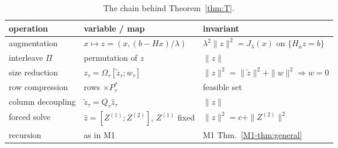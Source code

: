 \begin{table}[h]
\centering\small
\begin{tabular}{@{}lll@{}}
\toprule
operation & variable / map & invariant\\
\midrule
augmentation & $x\mapsto z=(x,(b-Hx)/\lambda)$ & $\lambda^2\|z\|^2=J_\lambda(x)$ on $\{H_az=b\}$\\
interleave $\Pi$ & permutation of $z$ & $\|z\|$\\
size reduction & $z_\tau=\Omega_\tau[\tilde z_\tau;w_\tau]$ & $\|z\|^2=\|\tilde z\|^2+\|w\|^2\Rightarrow w=0$\\
row compression & rows $\times P_\tau^*$ & feasible set\\
column decoupling & $\tilde z_\tau=Q_\tau\hat z_\tau$ & $\|z\|$\\
forced solve & $\hat z=[Z^{(1)};Z^{(2)}]$, $Z^{(1)}$ fixed & $\|z\|^2=c+\|Z^{(2)}\|^2$\\
recursion & as in M1 & M1 Thm.~\ref{M1-thm:general}\\
\bottomrule
\end{tabular}
\caption{The chain behind Theorem~\ref{thm:T}.}
\label{tab:Tchain}
\end{table}


